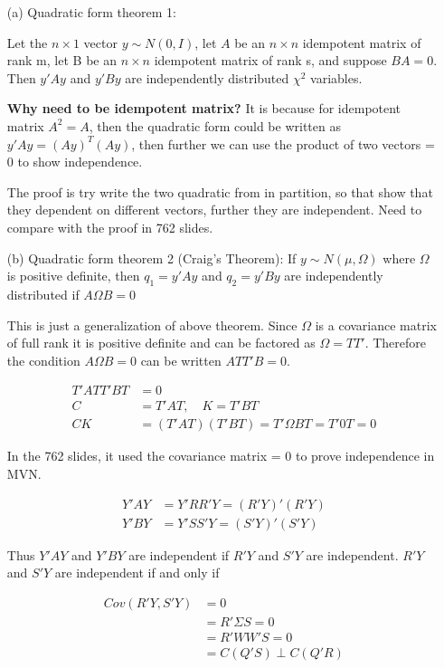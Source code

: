 \documentclass[11pt]{article} %
\begin{document}
\begin{itemize}
\item[(a)] Quadratic form theorem 1: 

Let the $n \times 1$ vector $y \sim N(0, I)$, let $A$ be an $n \times n$ idempotent matrix of rank m, let B be an $n \times n$ idempotent matrix of rank s, and suppose $BA = 0$. Then $y'Ay$ and $y'By$ are independently distributed $\chi^2$ variables.

\textbf{Why need to be idempotent matrix?} 
It is because for idempotent matrix $A^2 = A$, then the quadratic form could be written as $ y'Ay = (Ay)^T(Ay)$, then further we can use the product of two vectors = 0 to show independence. 

The proof is try write the two quadratic from in partition, so that show that they dependent on different vectors, further they are independent. Need to compare with the proof in 762 slides.

\item[(b)] Quadratic form theorem 2 (Craig's Theorem):
If $y \sim N(\mu, \Omega)$ where $\Omega$ is positive definite, then $q_1 = y'Ay$ and $q_2= y'By$ are independently distributed if $A\Omega B = 0$

This is just a generalization of above theorem. Since $\Omega$ is a covariance matrix of full rank it is positive definite and can be factored as $\Omega = T T'$.
Therefore the condition $A\Omega B =0$ can be written $ATT'B = 0$. 

\begin{align*}
	T'ATT'BT& = 0\\
	C &= T'AT, \quad K = T'BT \\
	CK &= (T'AT)(T'BT) = T' \Omega B T = T'0T = 0
\end{align*} 

In the 762 slides, it used the covariance matrix = 0 to prove independence in MVN.

\begin{align*}
	Y'AY& = Y' RR' Y = (R'Y)'(R'Y)\\
	Y'BY& = Y' SS' Y = (S'Y)'(S'Y)
\end{align*} 

Thus $Y'AY$ and $Y'BY$ are independent if $R'Y$ and $S'Y$ are independent. $R'Y$ and $S'Y$ are independent if and only if 

\begin{align*}
	Cov(R'Y, S'Y)& =  0\\
	& = R' \Sigma S = 0 \\
	&= R'WW'S = 0 \\
	&= C(Q'S) \perp C(Q'R)
\end{align*} 

\end{itemize}
\end{document}

